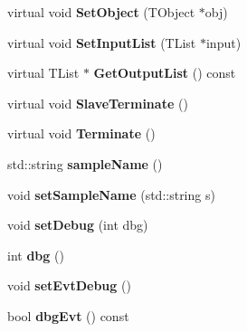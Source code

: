 \begin{DoxyCompactItemize}
\item 
\hypertarget{classToyNtAna_aa4f6da7849c4aedf11bf471bfb230be1}{
virtual void {\bfseries SetObject} (TObject $\ast$obj)}
\label{classToyNtAna_aa4f6da7849c4aedf11bf471bfb230be1}

\item 
\hypertarget{classToyNtAna_a258f14578de13d6ea3681f799d051758}{
virtual void {\bfseries SetInputList} (TList $\ast$input)}
\label{classToyNtAna_a258f14578de13d6ea3681f799d051758}

\item 
\hypertarget{classToyNtAna_ac48368047cf959f0915eb5e25b85e9c4}{
virtual TList $\ast$ {\bfseries GetOutputList} () const }
\label{classToyNtAna_ac48368047cf959f0915eb5e25b85e9c4}

\item 
\hypertarget{classToyNtAna_a6109af6f1ca8af3ec96c3196e0027b8e}{
virtual void {\bfseries SlaveTerminate} ()}
\label{classToyNtAna_a6109af6f1ca8af3ec96c3196e0027b8e}

\item 
\hypertarget{classToyNtAna_a77c192f64e86eddec09a9498bdd8400c}{
virtual void {\bfseries Terminate} ()}
\label{classToyNtAna_a77c192f64e86eddec09a9498bdd8400c}

\item 
\hypertarget{classToyNtAna_a8d815897ce02f3e7d3253643d130a16c}{
std::string {\bfseries sampleName} ()}
\label{classToyNtAna_a8d815897ce02f3e7d3253643d130a16c}

\item 
\hypertarget{classToyNtAna_afddaf2b07ac4043b2ed9c7029ddea935}{
void {\bfseries setSampleName} (std::string s)}
\label{classToyNtAna_afddaf2b07ac4043b2ed9c7029ddea935}

\item 
\hypertarget{classToyNtAna_a8a830a6c226f859733b397c7dc46e957}{
void {\bfseries setDebug} (int dbg)}
\label{classToyNtAna_a8a830a6c226f859733b397c7dc46e957}

\item 
\hypertarget{classToyNtAna_a7c5725725b32bf1d6fc1173d0f72ec3a}{
int {\bfseries dbg} ()}
\label{classToyNtAna_a7c5725725b32bf1d6fc1173d0f72ec3a}

\item 
\hypertarget{classToyNtAna_a502b684373b9b63abf8728eae8eb6e20}{
void {\bfseries setEvtDebug} ()}
\label{classToyNtAna_a502b684373b9b63abf8728eae8eb6e20}

\item 
\hypertarget{classToyNtAna_acda7021aad02c87fe12ad37d962d0dc0}{
bool {\bfseries dbgEvt} () const }
\label{classToyNtAna_acda7021aad02c87fe12ad37d962d0dc0}


\end{DoxyCompactItemize}
